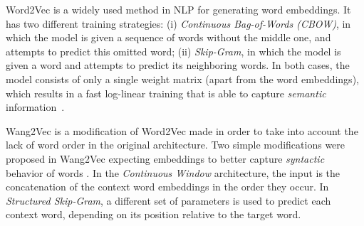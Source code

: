 
Word2Vec is a widely used method in NLP for generating word embeddings. It has two different training strategies: (i) \emph{Continuous Bag-of-Words (CBOW)}, in which the model is given a sequence of words without the middle one, and attempts to predict this omitted word; (ii) \emph{Skip-Gram}, in which the model is given a word and attempts to predict its neighboring words. In both cases, the model consists of only a single weight matrix (apart from the word embeddings), which results in a fast log-linear training that is able to capture \emph{semantic} information~\cite{mikolovetal2013}. 





Wang2Vec is a modification of Word2Vec made in order to take into account the lack of word order in the original architecture. Two simple modifications were proposed in Wang2Vec expecting embeddings to better capture \emph{syntactic} behavior of words \cite{Ling:2015:naacl}. In the \emph{Continuous Window} architecture, the input is the concatenation of the context word embeddings in the order they occur. In \emph{Structured Skip-Gram}, a different set of parameters is used to predict each context word, depending on its position relative to the target word. %




